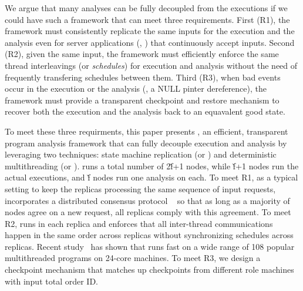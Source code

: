 

We argue that many analyses can be fully decoupled from the executions if 
we could have such a framework that can meet three requirements. First (R1), 
the framework must consistently replicate the same inputs for the execution and 
the analysis even for server applications (\eg, \apache) that continuously 
accept inputs. Second (R2), given the same input, the framework must 
efficiently enforce the same thread interleavings (or \emph{schedules}) for 
execution and analysis without the need of frequently transfering schedules 
between them. Third (R3), when bad events occur in the execution or the 
analysis (\eg, a NULL pinter dereference), the framework must provide a 
transparent checkpoint and restore mechanism to recover both the execution and 
the analysis back to an equavalent good state.


To meet these three requirments, this paper presents \xxx, an efficient, 
transparent program analysis framework that can fully decouple execution and 
analysis by leveraging two techniques: state machine replication (or \smr) and 
deterministic multithreading (or \dmt). \xxx runs a total number of 2\v{f}+1 
nodes, while \v{f}+1 nodes run the actual executions, and \v{f} nodes run one 
analysis on each. To meet R1, as a typical \smr setting to keep the replicas 
processing the same sequence of input requests, \xxx incorporates a distributed 
consensus protocol \paxos~\cite{paxos} so that as long as a majority of nodes 
agree on a new request, all replicas comply with this agreement. To meet R2, 
\dmt runs in each replica and enforces that all inter-thread communications 
happen in the same order across replicas without synchronizing schedules across 
replicas. Recent study~\cite{parrot:sosp13} has shown that \dmt runs fast on a 
wide range of 108 popular multithreaded programs on 24-core machines. To meet 
R3, we design a checkpoint mechanism that matches up checkpoints from different 
role machines with input total order ID.




